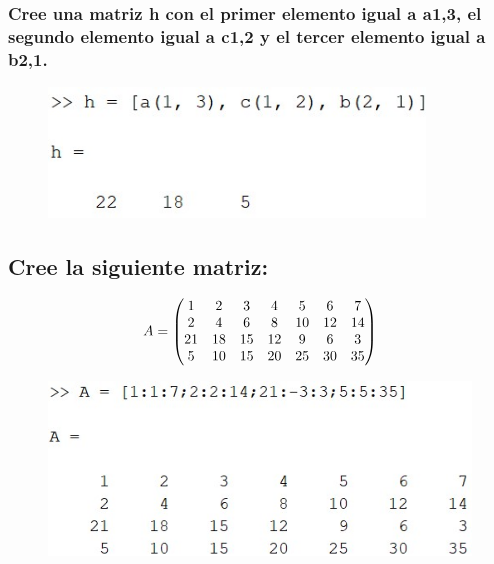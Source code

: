\documentclass{article}
\begin{document}
\subsubsection{Cree una matriz h con el primer elemento igual a a1,3, el segundo elemento igual a c1,2 y el tercer elemento igual a b2,1.}
\begin{figure}[H]
    \centering
    \includegraphics[width = 10cm]{img7e.jpg}
\end{figure}


\subsection{Cree la siguiente matriz:}

\begin{equation*}
\centering
A =
\begin{pmatrix}
1 & 2 & 3 & 4 & 5 & 6 & 7 \\
2 & 4 & 6 & 8 & 10 & 12 & 14 \\
21 & 18 & 15 & 12 & 9 & 6 & 3 \\
5 & 10 & 15 & 20 & 25 & 30 & 35
\end{pmatrix}
\end{equation*}

\begin{figure}[H]
    \centering
    \includegraphics[width = 15cm]{img8.jpg}
\end{figure}
\end{document}
